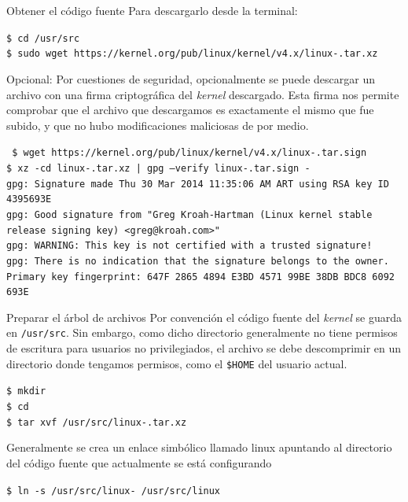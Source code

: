 \begin{frame}{Obtener el código fuente}
  Para descargarlo desde la terminal:
  \begin{block}{}
    \tiny {
    \texttt{\$ cd /usr/src}\\
    \texttt{\$ sudo wget
      https://kernel.org/pub/linux/kernel/v4.x/linux-\KERNELBASEVERSION.tar.xz} }
  \end{block}	
  \vfill
  \alert{Opcional}: Por cuestiones de seguridad, opcionalmente se puede
  descargar un archivo con una firma criptográfica del \textit{kernel}
  descargado. Esta firma nos permite comprobar que el archivo que
  descargamos es exactamente el mismo que fue subido, y que no hubo
  modificaciones maliciosas de por medio.
  \begin{block}{}
    \tiny{\texttt{%
\$ wget https://kernel.org/pub/linux/kernel/v4.x/linux-\KERNELBASEVERSION.tar.sign \\
\$ xz -cd linux-\KERNELBASEVERSION.tar.xz | gpg --verify linux-\KERNELBASEVERSION.tar.sign -\\
gpg: Signature made Thu 30 Mar 2014 11:35:06 AM ART using RSA key ID 4395693E\\
gpg: Good signature from "Greg Kroah-Hartman (Linux kernel stable release signing key) <greg@kroah.com>"\\
gpg: WARNING: This key is not certified with a trusted signature!\\
gpg:          There is no indication that the signature belongs to the owner.\\
Primary key fingerprint: 647F 2865 4894 E3BD 4571  99BE 38DB BDC8 6092 693E}}
\end{block}
    
\end{frame}

\begin{frame}{Preparar el árbol de archivos}
  Por convención el código fuente del \textit{kernel} se guarda en
  \texttt{/usr/src}. Sin embargo, como dicho directorio generalmente no
  tiene permisos de escritura para usuarios no privilegiados, el archivo se
  debe descomprimir en un directorio donde tengamos permisos, como el
  \texttt{\$HOME} del usuario actual.
  { \small
  \begin{block}{}
    \texttt{\$ mkdir \KERNELSOURCEPATH}\\
    \texttt{\$ cd \KERNELSOURCEPATH}\\
    \texttt{\$ tar xvf /usr/src/linux-\KERNELBASEVERSION.tar.xz}
  \end{block}}
  Generalmente se crea un enlace simbólico llamado linux apuntando al directorio del código fuente que actualmente se está configurando
  \begin{block}{}
    \texttt{\$ ln -s /usr/src/linux-\KERNELBASEVERSION\   /usr/src/linux}
  \end{block}

\end{frame}

